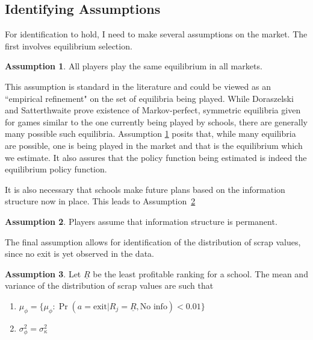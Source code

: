 \documentclass[12pt]{article}
\theoremstyle{definition}
\newtheorem{assumption}{Assumption}[section]
\begin{document}


\subsection{Identifying Assumptions}
\label{sec:id_assumptions}

For identification to hold, I need to make several assumptions on the market. The first involves equilibrium selection.
\begin{assumption}
	All players play the same equilibrium in all markets.
	\label{as:unique}
\end{assumption}
This assumption is standard in the literature and could be viewed as an ``empirical refinement" on the set of equilibria being played. While Doraszelski and Satterthwaite \cite{DoraSatter} prove existence of Markov-perfect, symmetric equilibria given for games similar to the one currently being played by schools, there are generally many possible such equilibria. Assumption \ref{as:unique} posits that, while many equilibria are possible, one is being played in the market and that is the equilibrium which we estimate. It also assures that the policy function being estimated is indeed the equilibrium policy function.

It is also necessary that schools make future plans based on the information structure now in place. This leads to Assumption~\ref{as:infoperm}
\begin{assumption}
  Players assume that information structure is permanent.
  \label{as:infoperm}
\end{assumption}

The final assumption allows for identification of the distribution of scrap values, since no exit is yet observed in the data.
\begin{assumption}
  Let $\underline{R}$ be the least profitable ranking for a school. The mean and variance of the distribution of scrap values are such that
  \begin{enumerate}
    \item $\mu_\phi = \{\mu_\phi : \Pr(a=\text{exit}|R_j=\underline{R}, \text{No info}) < 0.01\}$
    \item $\sigma^2_\phi = \sigma^2_\kappa$
  \end{enumerate}
  \label{as:scrap}
\end{assumption}
\end{document}
